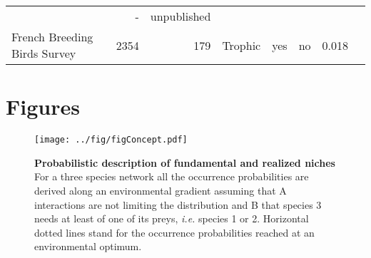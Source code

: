 \begin{longtable}[]{@{}lrrrrrrr@{}}
\begin{minipage}[t]{0.04\columnwidth}
\end{minipage} & \begin{minipage}[t]{0.06\columnwidth}\raggedleft\strut
-\strut
\end{minipage} & \begin{minipage}[t]{0.22\columnwidth}\raggedleft\strut
unpublished\strut
\end{minipage}\tabularnewline
\begin{minipage}[t]{0.15\columnwidth}\raggedright\strut
French Breeding Birds Survey\strut
\end{minipage} & \begin{minipage}[t]{0.07\columnwidth}\raggedleft\strut
2354\strut
\end{minipage} & \begin{minipage}[t]{0.07\columnwidth}\raggedleft\strut
179\strut
\end{minipage} & \begin{minipage}[t]{0.11\columnwidth}\raggedleft\strut
Trophic\strut
\end{minipage} & \begin{minipage}[t]{0.05\columnwidth}\raggedleft\strut
yes\strut
\end{minipage} & \begin{minipage}[t]{0.04\columnwidth}\raggedleft\strut
no\strut
\end{minipage} & \begin{minipage}[t]{0.06\columnwidth}\raggedleft\strut
0.018\strut
\end{minipage} & \begin{minipage}[t]{0.22\columnwidth}\raggedleft\strut
\citet{Gauzere2015}\strut
\end{minipage}\tabularnewline
\bottomrule
\end{longtable}

\newpage

\section{Figures}\label{figures}

\begin{figure}[htbp]
\centering
\texttt{[image: ../fig/figConcept.pdf]}
\caption{\textbf{Probabilistic description of fundamental and realized
niches} For a three species network all the occurrence probabilities are
derived along an environmental gradient assuming that A interactions are
not limiting the distribution and B that species 3 needs at least of one
of its preys, \emph{i.e.} species 1 or 2. Horizontal dotted lines stand
for the occurrence probabilities reached at an environmental
optimum.\label{fig:box1}}
\end{figure}

